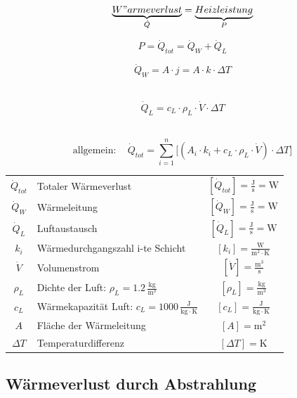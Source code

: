 $$\mathrm{\underbrace{W"armeverlust}_{\substack{\dot{Q}}}  = \underbrace{Heizleistung}_{\substack{P}}  }   $$

$$ \boxed{ P = \dot{Q}_{tot} = \dot{Q}_W + \dot{Q}_L }   $$

\begin{minipage}{0.46\linewidth}
$$ \boxed{ \dot{Q}_W = A \cdot j = A \cdot k \cdot \Delta T  }$$ \\
\end{minipage}
\hfill
\begin{minipage}{0.46\linewidth}
$$ \boxed{ \dot{Q}_L = c_L \cdot \rho_L \cdot \dot{V} \cdot \Delta T}   $$
\\
\end{minipage}



$$ \boxed{ \mathrm{allgemein: } \quad \dot{Q}_{tot} = \sum_{i=1}^n  \big[  (A_i \cdot k_i + c_L \cdot \rho_L \cdot \dot{V} ) \cdot \Delta T \big]  }   $$


\begin{tabular}{c l c}
	\rule{0pt}{10pt}$\dot{Q}_{tot}$ & Totaler Wärmeverlust & $[\dot{Q}_{tot}] = \mathrm{\frac{J}{s} = W}$ \\
	\rule{0pt}{10pt}$\dot{Q}_W$ & Wärmeleitung & $[\dot{Q}_W] = \mathrm{\frac{J}{s} = W}$ \\
	\rule{0pt}{10pt}$\dot{Q}_L$ & Luftaustausch & $[\dot{Q}_L] = \mathrm{\frac{J}{s} = W}$ \\
	\rule{0pt}{10pt}$k_i$ & Wärmedurchgangszahl i-te Schicht & $[k_i] = \mathrm{\frac{W}{m^2 \cdot K}}$ \\
	\rule{0pt}{10pt}$\dot{V}$ & Volumenstrom & $[\dot{V}] = \mathrm{\frac{m^3}{s}}$ \\
	\rule{0pt}{10pt}$\rho_L$ & Dichte der Luft: $\rho_L = 1.2 \, \mathrm{\frac{kg}{m^3}}$ & $[\rho_L] = \mathrm{\frac{kg}{m^3}}$ \\
	\rule{0pt}{10pt}$c_L$ & Wärmekapazität Luft: $c_L = 1000 \, \mathrm{\frac{J}{kg \cdot K}}$ & $[c_L] = \mathrm{\frac{J}{kg \cdot K}}$ \\
	$A$ & Fläche der Wärmeleitung & $[A] = \mathrm{m^2}$ \\
	$\Delta T$ & Temperaturdifferenz & $[\Delta T] = \mathrm{K}$ \\
\end{tabular}






\subsection{Wärmeverlust durch Abstrahlung}

